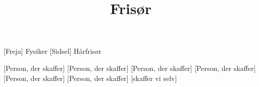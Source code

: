 \documentclass[a4paper,11pt]{article}
\title{Frisør}
\begin{document}
\maketitle



\begin{roles}
[Freja] Fysiker
[Sidsel] Hårfrisør
\end{roles}

\begin{props}
[Person, der skaffer]
[Person, der skaffer]
[Person, der skaffer]
[Person, der skaffer]
[Person, der skaffer]
[Person, der skaffer]
[skaffer vi selv]
\end{props}
\end{document}
